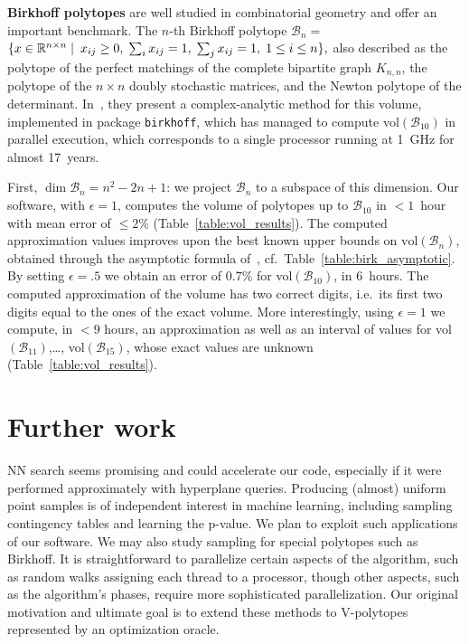 \documentclass[11pt,a4paper]{article}
\def\B{{\mathcal B}} \def\E{{\mathcal E}}
\def\vol{\mbox{vol}}
\def\vol{\mbox{vol}}
\begin{document}
\vspace{.5em}
\textbf{Birkhoff polytopes}
are well studied in combinatorial geometry and offer an important benchmark.
The $n$-th Birkhoff polytope 
$\B_n =$ $\{ x \in {\mathbb R}^{n\times n}\; |\, \ x_{ij} \geq 0,\;
\sum_i x_{ij} = 1,\; \sum_j x_{ij} = 1,\; 1 \leq i \leq n \},$
also described as the polytope of the 
perfect matchings of the complete bipartite graph $K_{n,n}$, 
the polytope of the $n\times n$ doubly stochastic matrices, 
and the Newton polytope of the determinant.
In~\cite{BeckPixton03}, they present a complex-analytic method for 
this volume, implemented in package {\tt birkhoff}, which has managed
to compute \vol$(\B_{10})$ in parallel execution, 
which corresponds to a single processor running at 1~GHz for almost 17~years.

First, $\dim\B_n = {n^2-2n+1}$: we project $\B_n$ to
a subspace of this dimension.
Our software, with $\epsilon=1$,  computes the volume of polytopes up to $\B_{10}$
in $<1$~hour with mean error of $\le 2\%$ (Table~\ref{table:vol_results}).
The computed approximation values improves upon the best known upper bounds on $\vol(\B_n)$, obtained through the asymptotic formula of~\cite{GMcKay09}, cf.\ Table~\ref{table:birk_asymptotic}.
By setting $\epsilon=.5$ we obtain an error of $0.7\%$ for \vol$(\B_{10})$,
in $6$~hours. The computed approximation of the volume has two correct digits, i.e.\ its first two digits equal to the ones of the exact volume.
More interestingly, using $\epsilon=1$ we compute, in $<9$ hours, an approximation as well as an interval of values for \vol$(\B_{11})$,\dots, \vol$(\B_{15})$,
whose exact values are unknown (Table~\ref{table:vol_results}).

\section{Further work}\label{sec:further}

NN search seems promising and could accelerate our
code, especially if it were performed approximately with
hyperplane queries.
Producing (almost) uniform point samples
is of independent interest in machine learning, including
sampling contingency tables and learning the p-value. We plan
to exploit such applications of our software. 
We may also study sampling for special polytopes such as Birkhoff.
It is straightforward to parallelize certain aspects of the algorithm, 
such as random walks assigning each thread to a processor,
though other aspects, such as the algorithm's phases,
require more sophisticated parallelization.
Our original motivation and ultimate goal is to extend these methods to
V-polytopes represented by an optimization oracle.
\end{document}

